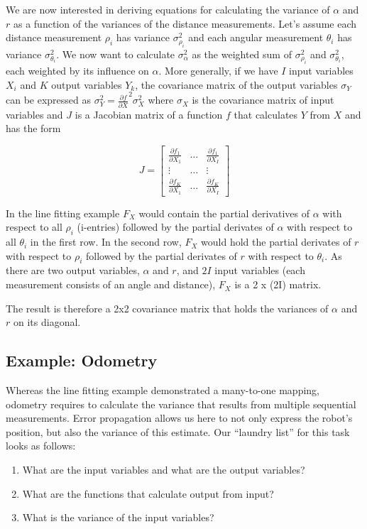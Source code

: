 We are now interested in deriving equations for calculating the variance of $ \alpha$ and $ r$ as a function of the variances of the distance measurements. Let's assume each distance measurement $ \rho_i$ has variance $ \sigma^2_{\rho_i}$ and each angular measurement $ \theta_i$ has variance $ \sigma^2_{\theta_i}$. We now want to calculate $ \sigma^2_{\alpha}$ as the weighted sum of  $ \sigma^2_{\rho_i}$ and $ \sigma^2_{\theta_i}$, each weighted by its influence on $ \alpha$.
More generally, if we have $ I$ input variables $ X_i$ and $K$ output variables $Y_k$, the covariance matrix of the output variables $ \sigma_Y$ can be expressed as $\sigma_Y^2=\frac{\partial f}{\partial X}^2 \sigma_X^2$ where $\sigma_X$ is the covariance matrix of input variables and $J$ is a Jacobian matrix of a function $ f$ that calculates $Y$ from $X$ and has the form

\begin{equation}
J=\left[
\begin{array}{ccc}
  \frac{\partial f_1}{\partial X_1} & \ldots & \frac{\partial f_1}{\partial X_I}\\
  \vdots & \ldots & \vdots\\
  \frac{\partial f_K}{\partial X_1} & \ldots & \frac{\partial f_K}{\partial X_I}
 \end{array}
 \right]
\end{equation}

In the line fitting example $ F_X$ would contain the partial derivatives of $ \alpha$ with respect to all $ \rho_i$ (i-entries) followed by the partial derivates of $ \alpha$ with respect to all $ \theta_i$ in the first row. In the second row, $ F_X$ would hold the partial derivates of $ r$ with respect to $ \rho_i$ followed by the partial derivates of $ r$ with respect to $ \theta_i$. As there are two output variables, $ \alpha$ and $ r$, and $2I$ input variables (each measurement consists of an angle and distance), $ F_X$ is a 2 x (2I) matrix.

The result is therefore a 2x2 covariance matrix that holds the variances of $ \alpha$ and $ r$ on its diagonal.

\subsection{Example: Odometry}
Whereas the line fitting example demonstrated a many-to-one mapping, odometry requires to calculate the variance that results from multiple sequential measurements.  Error propagation allows us here to not only express the robot's position, but also the variance of this estimate. Our ``laundry list'' for this task looks as follows:
\begin{enumerate}
\item What are the input variables and what are the output variables?
\item What are the functions that calculate output from input?
\item What is the variance of the input variables?
\end{enumerate}

